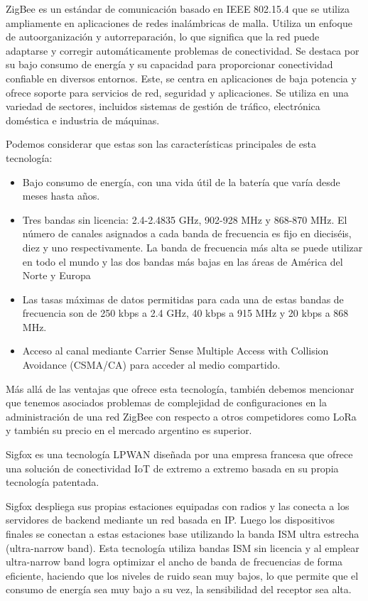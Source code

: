 ZigBee es un estándar de comunicación basado en IEEE 802.15.4 que se utiliza ampliamente en aplicaciones de redes inalámbricas de malla. Utiliza un enfoque de autoorganización y autorreparación, lo que significa que la red puede adaptarse y corregir automáticamente problemas de conectividad. Se destaca por su bajo consumo de energía y su capacidad para proporcionar conectividad confiable en diversos entornos. Este, se centra en aplicaciones de baja potencia y ofrece soporte para servicios de red, seguridad y aplicaciones. Se utiliza en una variedad de sectores, incluidos sistemas de gestión de tráfico, electrónica doméstica e industria de máquinas.

Podemos considerar que estas son las características principales de esta tecnología:
\begin{itemize}
    \item Bajo consumo de energía, con una vida útil de la batería que varía desde meses hasta años.
    \item Tres bandas sin licencia: 2.4-2.4835 GHz, 902-928 MHz y 868-870 MHz. El número de canales asignados a cada banda de frecuencia es fijo en dieciséis, diez y uno respectivamente. La banda de frecuencia más alta se puede utilizar en todo el mundo y las dos bandas más bajas en las áreas de América del Norte y Europa
    \item Las tasas máximas de datos permitidas para cada una de estas bandas de frecuencia son de 250 kbps a 2.4 GHz, 40 kbps a 915 MHz y 20 kbps a 868 MHz.
    \item Acceso al canal mediante Carrier Sense Multiple Access with Collision Avoidance (CSMA/CA) para acceder al medio compartido.
\end{itemize}

Más allá de las ventajas que ofrece esta tecnología, también debemos mencionar que tenemos asociados problemas de complejidad de configuraciones en la administración de una red ZigBee con respecto a otros competidores como LoRa y también su precio en el mercado argentino es superior.

Sigfox es una tecnología LPWAN diseñada por una empresa francesa que ofrece una solución de conectividad IoT de extremo a extremo basada en su propia tecnología patentada. 

Sigfox despliega sus propias estaciones equipadas con radios y las conecta a los servidores de backend mediante un red basada en IP. Luego los dispositivos finales se conectan a estas estaciones base utilizando la banda ISM ultra estrecha (ultra-narrow band). Esta tecnología utiliza bandas ISM sin licencia y al emplear ultra-narrow band logra optimizar el ancho de banda de frecuencias de forma eficiente, haciendo que los niveles de ruido sean muy bajos, lo que permite que el consumo de energía sea muy bajo a su vez, la sensibilidad del receptor sea alta.

